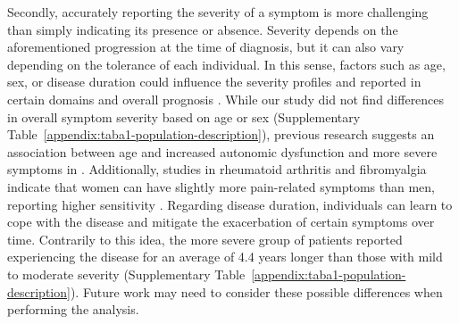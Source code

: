 Secondly, accurately reporting the severity of a symptom is more challenging than simply indicating its presence or absence.
Severity depends on the aforementioned progression at the time of diagnosis, but it can also vary depending on the tolerance of each individual.
In this sense, factors such as age, sex, or disease duration could influence the severity profiles and reported in certain domains and overall prognosis \citep{ghali2022FactorsInfluencing}.
While our study did not find differences in overall symptom severity based on age or sex (Supplementary Table~\ref{appendix:taba1-population-description}), 
previous research suggests an association between age and increased autonomic dysfunction and more severe symptoms in \cfs \citep{lewis2013ChronicFatigue}.
Additionally, studies in rheumatoid arthritis and fibromyalgia indicate that women can have slightly more pain-related symptoms than men, reporting higher sensitivity \citep{wolfe2018FibromyalgiaDiagnosis, vogel2023SexDifferences}.
Regarding disease duration, individuals can learn to cope with the disease and mitigate the exacerbation of certain symptoms over time.
Contrarily to this idea, the more severe group of patients reported experiencing the disease for an average of 4.4 years longer than those with mild to moderate severity (Supplementary Table~\ref{appendix:taba1-population-description}).
Future work may need to consider these possible differences when performing the analysis.
